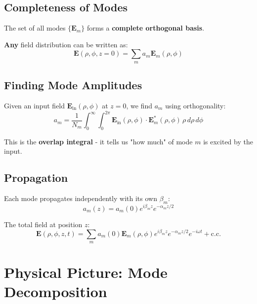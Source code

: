 \documentclass[12pt]{article}
\begin{document}
\subsection{Completeness of Modes}

The set of all modes $\{\mathbf{E}_m\}$ forms a \textbf{complete orthogonal basis}.

\textbf{Any} field distribution can be written as:
\begin{equation}
\mathbf{E}(\rho, \phi, z=0) = \sum_m a_m \mathbf{E}_m(\rho, \phi)
\end{equation}

\subsection{Finding Mode Amplitudes}

Given an input field $\mathbf{E}_{\text{in}}(\rho, \phi)$ at $z=0$, we find $a_m$ using orthogonality:
\begin{equation}
a_m = \frac{1}{N_m}\int_0^\infty \int_0^{2\pi} \mathbf{E}_{\text{in}}(\rho, \phi) \cdot \mathbf{E}_m^*(\rho, \phi) \, \rho \, d\rho \, d\phi
\end{equation}

This is the \textbf{overlap integral} - it tells us "how much" of mode $m$ is excited by the input.

\subsection{Propagation}

Each mode propagates independently with its own $\beta_m$:
\begin{equation}
a_m(z) = a_m(0) e^{i\beta_m z} e^{-\alpha_m z/2}
\end{equation}

The total field at position $z$:
\begin{equation}
\mathbf{E}(\rho, \phi, z, t) = \sum_m a_m(0) \mathbf{E}_m(\rho, \phi) e^{i\beta_m z} e^{-\alpha_m z/2} e^{-i\omega t} + \text{c.c.}
\end{equation}

\section{Physical Picture: Mode Decomposition}
\end{document}

